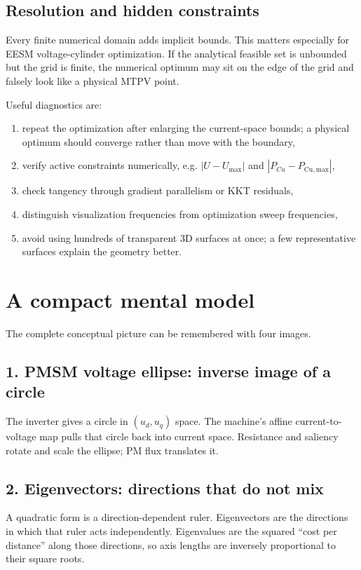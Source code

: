 \documentclass[11pt,a4paper]{article}
\newcommand{\Umax}{U_{\max}}
\newcommand{\Pmax}{P_{\mathrm{Cu,max}}}
\begin{document}
\subsection{Resolution and hidden constraints}

Every finite numerical domain adds implicit bounds. This matters especially for EESM voltage-cylinder optimization. If the analytical feasible set is unbounded but the grid is finite, the numerical optimum may sit on the edge of the grid and falsely look like a physical MTPV point.

Useful diagnostics are:

\begin{enumerate}
  \item repeat the optimization after enlarging the current-space bounds; a physical optimum should converge rather than move with the boundary,
  \item verify active constraints numerically, e.g. $|U-\Umax|$ and $|P_{Cu}-\Pmax|$,
  \item check tangency through gradient parallelism or KKT residuals,
  \item distinguish visualization frequencies from optimization sweep frequencies,
  \item avoid using hundreds of transparent 3D surfaces at once; a few representative surfaces explain the geometry better.
\end{enumerate}

\section{A compact mental model}

The complete conceptual picture can be remembered with four images.

\subsection*{1. PMSM voltage ellipse: inverse image of a circle}
The inverter gives a circle in $(u_d,u_q)$ space. The machine's affine current-to-voltage map pulls that circle back into current space. Resistance and saliency rotate and scale the ellipse; PM flux translates it.

\subsection*{2. Eigenvectors: directions that do not mix}
A quadratic form is a direction-dependent ruler. Eigenvectors are the directions in which that ruler acts independently. Eigenvalues are the squared ``cost per distance'' along those directions, so axis lengths are inversely proportional to their square roots.
\end{document}
